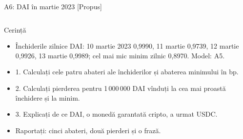 \begin{frame}{A6: DAI în martie 2023 [Propus]}
\propsub
\itemsize{\scriptsize}
\begin{columns}[T]
\begin{column}{\taskw}
\begin{block}{Cerință}
\begin{itemize}
    \item Închiderile zilnice DAI: 10 martie 2023 0{,}9990, 11 martie 0{,}9739, 12 martie 0{,}9926, 13 martie 0{,}9989; cel mai mic minim zilnic 0{,}8970. Model: A5.
    \item 1. Calculați cele patru abateri ale închiderilor și abaterea minimului în bp.
    \item 2. Calculați pierderea pentru 1\,000\,000 DAI vînduți la cea mai proastă închidere și la minim.
    \item 3. Explicați de ce DAI, o monedă garantată cripto, a urmat USDC.
    \item Raportați: cinci abateri, două pierderi și o frază.
\end{itemize}
\end{block}
\end{column}
\begin{column}{\solw}
\end{column}
\end{columns}
\end{frame}


